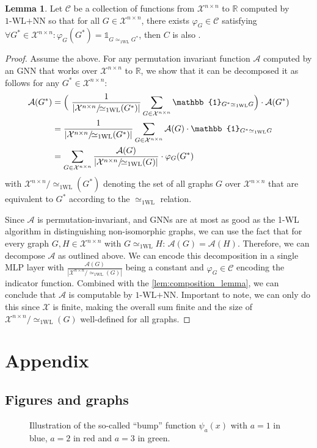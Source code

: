 \documentclass[11pt, dvipsnames, DIV=12]{scrreprt}
\theoremstyle{definition}
\newtheorem{lemma}[theorem]{Lemma}
\newcommand{\cA}{\mathcal{A}}
\newcommand{\cC}{\mathcal{C}}
\newcommand{\cX}{\mathcal{X}}
\newcommand{\Rb}{\mathbb{R}}
\newcommand{\wlnn}{\text{1-WL+NN}}
\newcommand{\wliso}{\simeq_{\text{1WL}}}
\newcommand{\xnn}{\mathcal{X}^{n \times n}}
\newcommand{\gapp}{\text{GNN-Approximating}}
\begin{document}
\begin{lemma}\label{lem:decompose_gnn_as_wl}
    Let $\mathcal{C}$ be a collection of functions from $\mathcal{X}^{n \times n}$ to $\Rb$ computed by $\wlnn$ so that for all $G \in \mathcal{X}^{n \times n}$, there exists 
    $\varphi_G \in \cC$ satisfying $\forall G^* \in \xnn: \varphi_G(G^*) = \mathbb{1}_{G \wliso G^*}$, then $C$ is also \gapp.
\end{lemma}

\begin{proof}
    Assume the above. For any permutation invariant function $\mathcal{A}$ computed by an GNN that works over $\xnn$ to $\Rb$, we show that it can be decomposed it as follows for any $G^* \in \mathcal{X}^{n \times n}$:
    \begin{align}
        \mathcal{A}(G^*) &= \Bigl( \ \frac{1}{|\xnn/\!{\wliso}(G^*)|}\sum_{G \in \xnn} \mathbb{1}_{G^* \wliso G} \Bigr) \cdot \mathcal{A}(G^*) \nonumber \\
        &= \frac{1}{|\xnn/\!{\wliso}(G^*)|}\sum_{G \in \mathcal{X}^{n \times n}} \mathcal{A}(G) \cdot \mathbb{1}_{G^* \wliso G} \nonumber \\
        &= \sum_{G \in \mathcal{X}^{n \times n}} \frac{\mathcal{A}(G)}{|\xnn/\!{\wliso}(G)|}  \cdot \varphi_G(G^*)
    \end{align}
    with $\xnn/\!{\wliso}(G^*)$ denoting the set of all graphs $G$ over $\xnn$ that are equivalent to $G^*$ according to the $\wliso$ relation.

    Since $\cA$ is permutation-invariant, and GNNs are at most as good as the 1-WL algorithm in distinguishing non-isomorphic graphs, we can use the fact that for every graph $G,H \in \xnn$ with $G \wliso H$: $\cA(G) = \cA(H)$. Therefore, we can decompose $\cA$ as outlined above. We can encode this decomposition in a single MLP layer with $\frac{\cA(G)}{|\xnn/\!{\wliso}(G)|}$ being a constant and $\varphi_G \in \cC$ encoding the indicator function. Combined with the \cref{lem:composition_lemma}, we can conclude that $\cA$ is computable by $\wlnn$. Important to note, we can only do this since $\cX$ is finite, making the overall sum finite and the size of $\xnn/\!{\wliso}(G)$ well-defined for all graphs.
    
\end{proof}


\newpage
\section*{Appendix}
\subsection*{Figures and graphs}
\begin{figure}[H]
    \centering
    
    \caption{Illustration of the so-called ``bump'' function $\psi_a(x)$ with $a = 1$ in blue, $ a = 2$ in red and $a = 3$ in green.}
    \label{fig:bump_function}
\end{figure}
\end{document}
